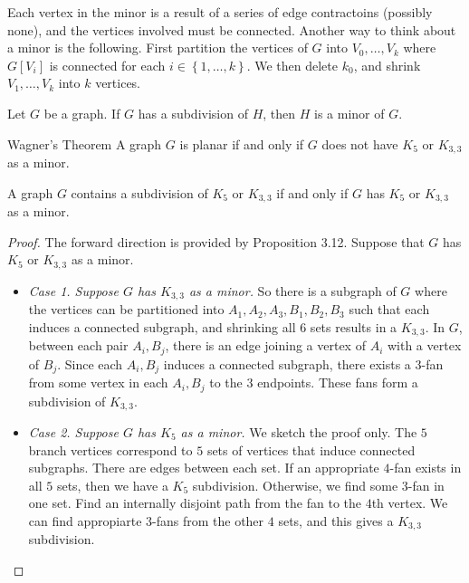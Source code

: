 \documentclass[co342]{subfiles}
\begin{document}
    \np Each vertex in the minor is a result of a series of edge contractoins (possibly none), and the vertices involved must be connected. Another way to think about a minor is the following. First partition the vertices of $G$ into $V_0,\ldots,V_k$ where $G\left[ V_i \right]$ is connected for each $i\in\left\lbrace 1,\ldots,k \right\rbrace$. We then delete $k_0$, and shrink $V_1,\ldots,V_k$ into $k$ vertices.

    \begin{prop}{}
        Let $G$ be a graph. If $G$ has a subdivision of $H$, then $H$ is a minor of $G$.
    \end{prop}

    \begin{theorem}{Wagner's Theorem}
        A graph $G$ is planar if and only if $G$ does not have $K_5$ or $K_{3,3}$ as a minor.
    \end{theorem}
    
    \begin{prop}{}
        A graph $G$ contains a subdivision of $K_5$ or $K_{3,3}$ if and only if $G$ has $K_5$ or $K_{3,3}$ as a minor.
    \end{prop}

    \begin{proof}
        The forward direction is provided by Proposition 3.12. Suppose that $G$ has $K_5$ or $K_{3,3}$ as a minor.
        \begin{itemize}
            \item \textit{Case 1. Suppose $G$ has $K_{3,3}$ as a minor.} So there is a subgraph of $G$ where the vertices can be partitioned into $A_1,A_2,A_3,B_1,B_2,B_3$ such that each induces a connected subgraph, and shrinking all $6$ sets results in a $K_{3,3}$. In $G$, between each pair $A_i,B_j$, there is an edge joining a vertex of $A_i$ with a vertex of $B_j$. Since each $A_i, B_j$ induces a connected subgraph, there exists a $3$-fan from some vertex in each $A_i, B_j$ to the $3$ endpoints. These fans form a subdivision of $K_{3,3}$.

            \item \textit{Case 2. Suppose $G$ has $K_5$ as a minor.} We sketch the proof only. The $5$ branch vertices correspond to $5$ sets of vertices that induce connected subgraphs. There are edges between each set. If an appropriate $4$-fan exists in all $5$ sets, then we have a $K_5$ subdivision. Otherwise, we find some $3$-fan in one set. Find an internally disjoint path from the fan to the $4$th vertex. We can find appropiarte $3$-fans from the other $4$ sets, and this gives a $K_{3,3}$ subdivision. \qqedsym
        \end{itemize} 
    \end{proof}
    
\end{document}

